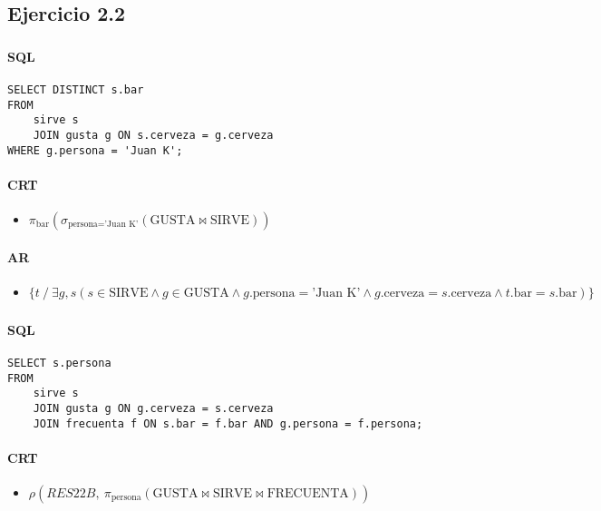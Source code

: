 \subsection{Ejercicio 2.2}
\subsubsection{}
\paragraph{SQL}
\begin{verbatim}
SELECT DISTINCT s.bar
FROM
	sirve s
	JOIN gusta g ON s.cerveza = g.cerveza
WHERE g.persona = 'Juan K';
\end{verbatim}

\paragraph{CRT}
\begin{itemize}
\item [] $\pi_{\text{bar}}(\sigma_{\text{persona} = \text{'Juan K'}}(\text{GUSTA} \bowtie \text{SIRVE}))$
\end{itemize}
\paragraph{AR}
\begin{itemize}
\item[] $\{t~/~\exists g,s (s\in\text{SIRVE} \land g\in\text{GUSTA} \land g.\text{persona} = \text{'Juan K'}\land g.\text{cerveza} = s.\text{cerveza} \land t.\text{bar} = s.\text{bar})\}$
\end{itemize}
\subsubsection{}
\paragraph{SQL}
\begin{verbatim}
SELECT s.persona
FROM 
	sirve s
	JOIN gusta g ON g.cerveza = s.cerveza
	JOIN frecuenta f ON s.bar = f.bar AND g.persona = f.persona;
\end{verbatim}


\paragraph{CRT}
\begin{itemize}
\item [] $\rho(RES22B,~\pi_{\text{persona}}(\text{GUSTA} \bowtie \text{SIRVE} \bowtie \text{FRECUENTA}))$	
\end{itemize}

